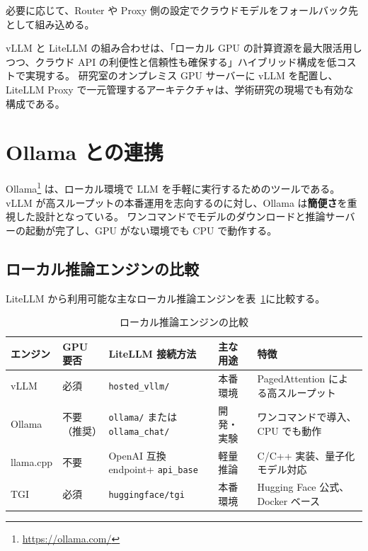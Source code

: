 \documentclass[a4paper,11pt]{ltjsarticle}
\newcommand{\code}[1]{\texttt{#1}}
\begin{document}
必要に応じて、Router や Proxy 側の設定でクラウドモデルをフォールバック先として組み込める。

\begin{tipbox}[ポイント]
vLLM と LiteLLM の組み合わせは、「ローカル GPU の計算資源を最大限活用しつつ、クラウド API の利便性と信頼性も確保する」ハイブリッド構成を低コストで実現する。
研究室のオンプレミス GPU サーバーに vLLM を配置し、LiteLLM Proxy で一元管理するアーキテクチャは、学術研究の現場でも有効な構成である。
\end{tipbox}


\section{Ollama との連携}
\label{sec:ollama}

Ollama\footnote{\url{https://ollama.com/}} は、ローカル環境で LLM を手軽に実行するためのツールである。
vLLM が高スループットの本番運用を志向するのに対し、Ollama は\textbf{簡便さ}を重視した設計となっている。
ワンコマンドでモデルのダウンロードと推論サーバーの起動が完了し、GPU がない環境でも CPU で動作する。

\subsection{ローカル推論エンジンの比較}

LiteLLM から利用可能な主なローカル推論エンジンを表~\ref{tab:local_engines}に比較する。

\begin{table}[htbp]
\centering
\caption{ローカル推論エンジンの比較}
\label{tab:local_engines}
\small
\begin{tabular}{lp{2cm}p{2.2cm}p{2cm}p{4cm}}
\toprule
エンジン & GPU 要否 & LiteLLM 接続方法 & 主な用途 & 特徴 \\
\midrule
vLLM        & 必須   & \code{hosted\_vllm/} & 本番環境   & PagedAttention による高スループット \\
Ollama      & 不要\newline（推奨） & \code{ollama/} または\newline \code{ollama\_chat/} & 開発・実験 & ワンコマンドで導入、CPU でも動作 \\
llama.cpp   & 不要   & OpenAI 互換 endpoint\newline + \code{api\_base} & 軽量推論   & C/C++ 実装、量子化モデル対応 \\
TGI         & 必須   & \code{huggingface/}\newline \code{tgi} & 本番環境   & Hugging Face 公式、Docker ベース \\
\bottomrule
\end{tabular}
\end{table}
\end{document}
